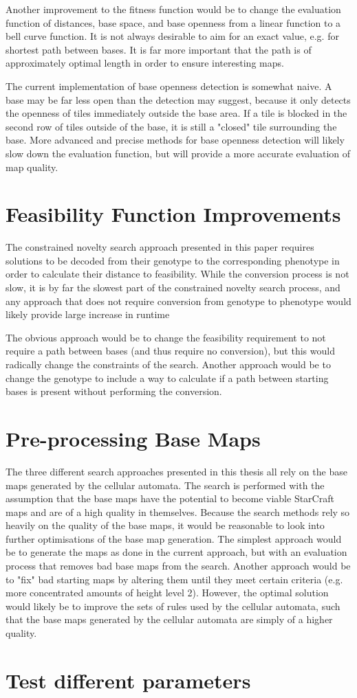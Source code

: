 Another improvement to the fitness function would be to change the evaluation function of distances, base space, and base openness from a linear function to a bell curve function. It is not always desirable to aim for an exact value, e.g. for shortest path between bases. It is far more important that the path is of approximately optimal length in order to ensure interesting maps.

The current implementation of base openness detection is somewhat naive. A base may be far less open than the detection may suggest, because it only detects the openness of tiles immediately outside the base area. If a tile is blocked in the second row of tiles outside of the base, it is still a "closed" tile surrounding the base. More advanced and precise methods for base openness detection will likely slow down the evaluation function, but will provide a more accurate evaluation of map quality.

\section{Feasibility Function Improvements}
\label{futurework_feasibility}
The constrained novelty search approach presented in this paper requires solutions to be decoded from their genotype to the corresponding phenotype in order to calculate their distance to feasibility. While the conversion process is not slow, it is by far the slowest part of the constrained novelty search process, and any approach that does not require conversion from genotype to phenotype would likely provide large increase in runtime 

The obvious approach would be to change the feasibility requirement to not require a path between bases (and thus require no conversion), but this would radically change the constraints of the search. Another approach would be to change the genotype to include a way to calculate if a path between starting bases is present without performing the conversion.
\section{Pre-processing Base Maps}
\label{futurework_preprocess}
The three different search approaches presented in this thesis all rely on the base maps generated by the cellular automata. The search is performed with the assumption that the base maps have the potential to become viable StarCraft maps and are of a high quality in themselves. Because the search methods rely so heavily on the quality of the base maps, it would be reasonable to look into further optimisations of the base map generation. The simplest approach would be to generate the maps as done in the current approach, but with an evaluation process that removes bad base maps from the search. Another approach would be to "fix" bad starting maps by altering them until they meet certain criteria (e.g. more concentrated amounts of height level 2). However, the optimal solution would likely be to improve the sets of rules used by the cellular automata, such that the base maps generated by the cellular automata are simply of a higher quality.

\section{Test different parameters}
\label{futurework_}